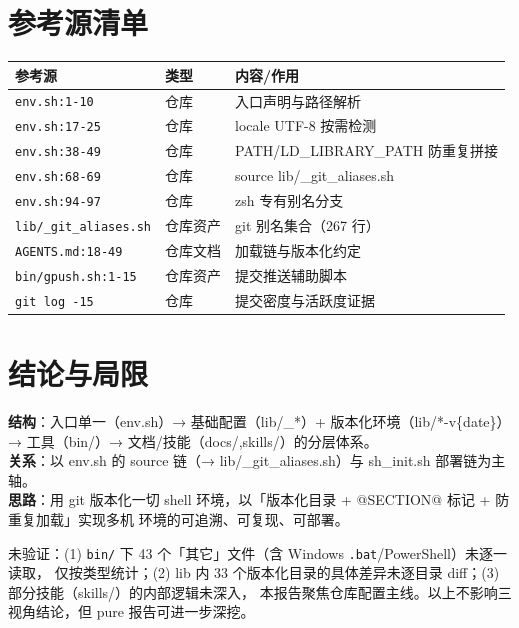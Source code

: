 \documentclass[UTF8]{ctexart}
\begin{document}
\section{参考源清单}
\begin{xltabular}{\textwidth}{llX}
\toprule
\textcolor{evidence}{参考源} & 类型 & 内容/作用 \\
\midrule
\endhead
\texttt{\nolinkurl{env.sh:1-10}} & 仓库 & 入口声明与路径解析 \\
\texttt{\nolinkurl{env.sh:17-25}} & 仓库 & locale UTF-8 按需检测 \\
\texttt{\nolinkurl{env.sh:38-49}} & 仓库 & PATH/LD\_LIBRARY\_PATH 防重复拼接 \\
\texttt{\nolinkurl{env.sh:68-69}} & 仓库 & source lib/\_git\_aliases.sh \\
\texttt{\nolinkurl{env.sh:94-97}} & 仓库 & zsh 专有别名分支 \\
\texttt{\nolinkurl{lib/_git_aliases.sh}} & 仓库资产 & git 别名集合（267 行） \\
\texttt{\nolinkurl{AGENTS.md:18-49}} & 仓库文档 & 加载链与版本化约定 \\
\texttt{\nolinkurl{bin/gpush.sh:1-15}} & 仓库资产 & 提交推送辅助脚本 \\
\texttt{\nolinkurl{git log -15}} & 仓库 & 提交密度与活跃度证据 \\
\bottomrule
\end{xltabular}

\section{结论与局限}
\begin{conclbox}
\textbf{结构}：入口单一（env.sh）→ 基础配置（lib/\_*）+ 版本化环境（lib/*-v\{date\}）→ 工具（bin/）→
文档/技能（docs/,skills/）的分层体系。\\
\textbf{关系}：以 env.sh 的 source 链（→ lib/\_git\_aliases.sh）与 sh\_init.sh 部署链为主轴。\\
\textbf{思路}：用 git 版本化一切 shell 环境，以「版本化目录 + @SECTION@ 标记 + 防重复加载」实现多机
环境的可追溯、可复现、可部署。
\end{conclbox}

\begin{warnbox}
\textcolor{warn}{未验证}：(1) \texttt{bin/} 下 43 个「其它」文件（含 Windows \texttt{.bat}/PowerShell）未逐一读取，
仅按类型统计；(2) lib 内 33 个版本化目录的具体差异未逐目录 diff；(3) 部分技能（skills/）的内部逻辑未深入，
本报告聚焦仓库配置主线。以上不影响三视角结论，但 pure 报告可进一步深挖。
\end{warnbox}
\end{document}
